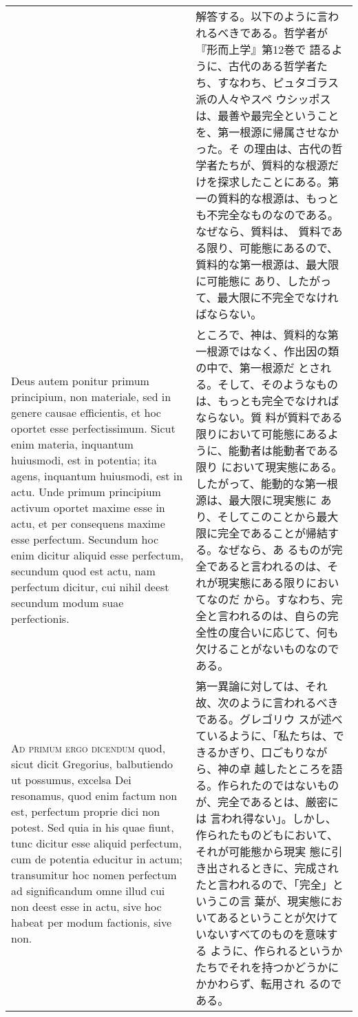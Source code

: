 \documentclass[10pt]{jsarticle}
\begin{document}
\begin{longtable}{p{21em}p{21em}}
&

解答する。以下のように言われるべきである。哲学者が『形而上学』第12巻で
語るように、古代のある哲学者たち、すなわち、ピュタゴラス派の人々やスペ
ウシッポスは、最善や最完全ということを、第一根源に帰属させなかった。そ
の理由は、古代の哲学者たちが、質料的な根源だけを探求したことにある。第
一の質料的な根源は、もっとも不完全なものなのである。なぜなら、質料は、
質料である限り、可能態にあるので、質料的な第一根源は、最大限に可能態に
あり、したがって、最大限に不完全でなければならない。


\\

Deus autem ponitur primum principium, non materiale, sed in genere
causae efficientis, et hoc oportet esse perfectissimum. Sicut enim
materia, inquantum huiusmodi, est in potentia; ita agens, inquantum
huiusmodi, est in actu. Unde primum principium activum oportet maxime
esse in actu, et per consequens maxime esse perfectum. Secundum hoc
enim dicitur aliquid esse perfectum, secundum quod est actu, nam
perfectum dicitur, cui nihil deest secundum modum suae perfectionis.

&

ところで、神は、質料的な第一根源ではなく、作出因の類の中で、第一根源だ
とされる。そして、そのようなものは、もっとも完全でなければならない。質
料が質料である限りにおいて可能態にあるように、能動者は能動者である限り
において現実態にある。したがって、能動的な第一根源は、最大限に現実態に
あり、そしてこのことから最大限に完全であることが帰結する。なぜなら、あ
るものが完全であると言われるのは、それが現実態にある限りにおいてなのだ
から。すなわち、完全と言われるのは、自らの完全性の度合いに応じて、何も
欠けることがないものなのである。

\\


{\scshape Ad primum ergo dicendum} quod, sicut dicit Gregorius,
balbutiendo ut possumus, excelsa Dei resonamus, quod enim factum non
est, perfectum proprie dici non potest. Sed quia in his quae fiunt,
tunc dicitur esse aliquid perfectum, cum de potentia educitur in
actum; transumitur hoc nomen perfectum ad significandum omne illud cui
non deest esse in actu, sive hoc habeat per modum factionis, sive non.
&第一異論に対しては、それ故、次のように言われるべきである。グレゴリウ
スが述べているように、「私たちは、できるかぎり、口ごもりながら、神の卓
越したところを語る。作られたのではないものが、完全であるとは、厳密には
言われ得ない」。しかし、作られたものどもにおいて、それが可能態から現実
態に引き出されるときに、完成されたと言われるので、「完全」というこの言
葉が、現実態においてあるということが欠けていないすべてのものを意味する
ように、作られるというかたちでそれを持つかどうかにかかわらず、転用され
るのである。



\end{longtable}
\end{document}
